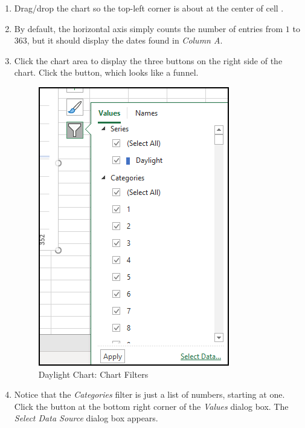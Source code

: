 \begin{enumbox}
\begin{enumerate}
		\item Drag/drop the chart so the top-left corner is about at the center of cell .
		\item By default, the horizontal axis simply counts the number of entries from $ 1 $ to $ 363 $, but it should display the dates found in \textit{Column A}.
		\item Click the chart area to display the three buttons on the right side of the chart. Click the  button, which looks like a funnel.
		
		\begin{figure}[H]
			\centering
			\includegraphics[width=\maxwidth{.50\linewidth}]{gfx/ch09_fig90}
			\caption{Daylight Chart: Chart Filters}
			\label{09:fig90}
		\end{figure}
	
		\item Notice that the \textit{Categories} filter is just a list of numbers, starting at one. Click the  button at the bottom right corner of the \textit{Values} dialog box. The \textit{Select Data Source} dialog box appears.
	

\end{enumerate}
\end{enumbox}
